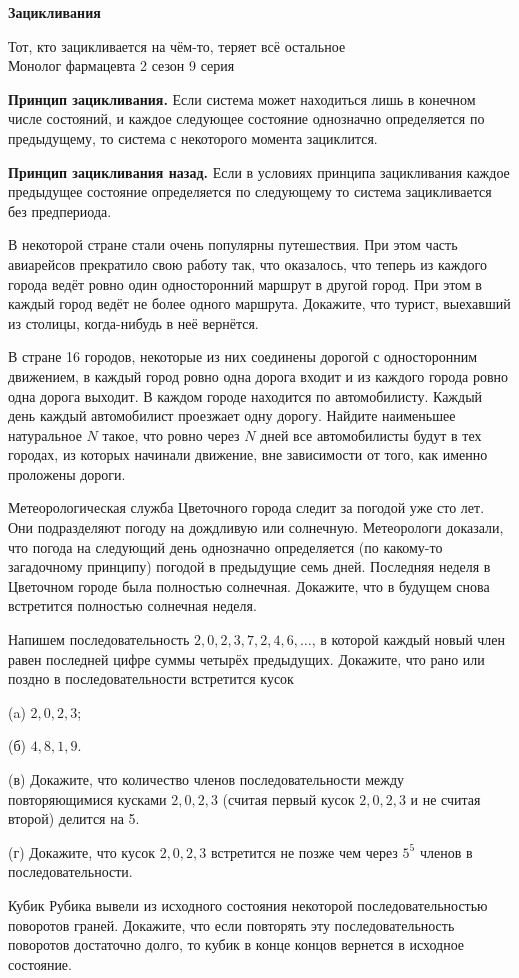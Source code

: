 \centerline{\bf \Huge Зацикливания}

\begin{flushright}
        \scriptsize{Тот, кто зацикливается на чём-то, теряет всё остальное\\
        Монолог фармацевта 2 сезон 9 серия}
\end{flushright}

\textbf{Принцип зацикливания.} Если система может находиться лишь в конечном числе состояний, и каждое следующее состояние однозначно определяется по предыдущему, то система с некоторого момента зациклится.

\textbf{Принцип зацикливания назад.} Если в условиях принципа зацикливания каждое предыдущее состояние определяется по следующему то система зацикливается без предпериода.



В некоторой стране стали очень популярны путешествия. При этом часть авиарейсов прекратило свою работу так, что оказалось, что теперь из каждого города ведёт ровно один односторонний маршрут в другой город. При этом в каждый город ведёт не более одного маршрута. Докажите, что турист, выехавший из столицы, когда-нибудь в неё вернётся.

В стране 16 городов, некоторые из них соединены дорогой с односторонним движением, в каждый город ровно одна дорога входит и из каждого города ровно одна дорога выходит. В каждом городе находится по автомобилисту. Каждый день каждый автомобилист проезжает одну дорогу. Найдите наименьшее натуральное $N$ такое, что ровно через $N$ дней все автомобилисты будут в тех городах, из которых начинали движение, вне зависимости от того, как именно проложены дороги.

Метеорологическая служба Цветочного города следит за погодой уже сто лет. Они подразделяют погоду на дождливую или солнечную. Метеорологи доказали, что погода на следующий день однозначно определяется (по какому-то загадочному принципу) погодой в предыдущие семь дней. Последняя неделя в Цветочном городе была полностью солнечная. Докажите, что в будущем снова встретится полностью солнечная неделя.


Напишем последовательность $2,0,2,3,7,2,4,6, \ldots$, в которой каждый новый член равен последней цифре суммы четырёх предыдущих. Докажите, что рано или поздно в последовательности встретится кусок

(a) $2,0,2,3$;

(б) $4,8,1,9$.

\newpage

\hspace{3mm}

(в) Докажите, что количество членов последовательности между повторяющимися кусками $2,0,2,3$ (считая первый кусок $2,0,2,3$ и не считая второй) делится на 5.

(г) Докажите, что кусок $2,0,2,3$ встретится не позже чем через $5^5$ членов в последовательности.

Кубик Рубика вывели из исходного состояния некоторой последовательностью поворотов граней. Докажите, что если повторять эту последовательность поворотов достаточно долго, то кубик в конце концов вернется в исходное состояние.